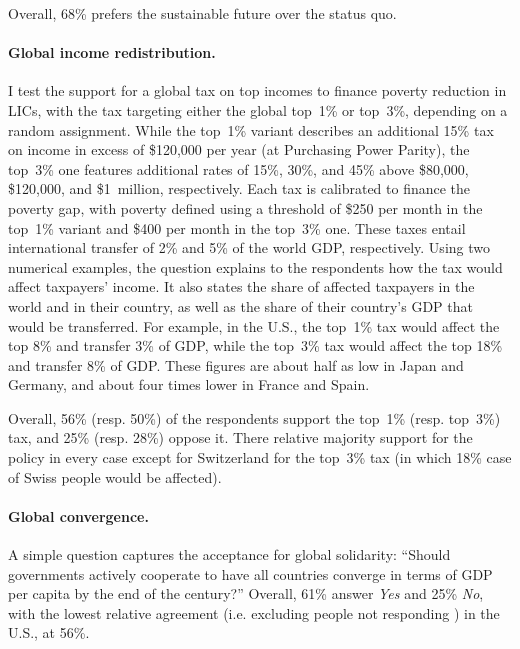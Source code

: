 \documentclass[12pt,english]{article}
\begin{document}
\begin{bibunit}
Overall, 68\% prefers the sustainable future over the status quo.

\paragraph{Global income redistribution.}

I test the support for a global tax on top incomes to finance poverty reduction in LICs, with the tax targeting either the global top~1\% or top~3\%, depending on a random assignment. While the top~1\% variant describes an additional 15\% tax on income in excess of \$120,000 per year (at Purchasing Power Parity), the top~3\% one features additional rates of 15\%, 30\%, and 45\% above \$80,000, \$120,000, and \$1~million, respectively. Each tax is calibrated to finance the poverty gap, with poverty defined using a threshold of \$250 per month in the top~1\% variant and \$400 per month in the top~3\% one. These taxes entail international transfer of 2\% and 5\% of the world GDP, respectively. %
Using two numerical examples, the question explains to the respondents how the tax would affect taxpayers' income. It also states the share of affected taxpayers in the world and in their country, as well as the share of their country's GDP that would be transferred. For example, in the U.S., the top~1\% tax would affect the top 8\% and transfer 3\% of GDP, while the top~3\% tax would affect the top 18\% and transfer 8\% of GDP. These figures are about half as low in Japan and Germany, and about four times lower in France and Spain. %

Overall, 56\% (resp. 50\%) of the respondents support the top~1\% (resp. top~3\%) tax, and 25\% (resp. 28\%) oppose it. There relative majority support for the policy in every case except for Switzerland for the top~3\% tax (in which 18\% case of Swiss people would be affected).

\paragraph{Global convergence.}

A simple question captures the acceptance for global solidarity: ``Should governments actively cooperate to have all countries converge in terms of GDP per capita by the end of the century?'' Overall, 61\% answer \textit{Yes} and 25\% \textit{No}, with the lowest relative agreement (i.e. excluding people not responding%
) in the U.S., at 56\%.


\end{bibunit}
\end{document}
